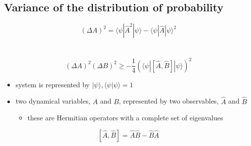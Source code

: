 \documentclass[a4paper,11pt,normalem]{article}
\begin{document}
\subsection{Variance of the distribution of probability}\label{variance-of-the-distribution-of-probability}
\[
    (\Delta A)^2 = \langle\psi|\hat{A}^2|\psi\rangle - \langle\psi|\hat{A}|\psi\rangle^2
\]

\section{}\label{lecture-9}

\[
    (\Delta A)^2(\Delta B)^2 \geq -\frac{1}{4}(\langle\psi|[\hat{A},\hat{B}]|\psi\rangle)^2
\]

\begin{itemize}
\item
  system is represented by \(|\psi\rangle, \langle\psi|\psi\rangle = 1\)
\item
  two dynamical variables, \(A\) and \(B\), represented by two
  observables, \(\hat{A}\) and \(\hat{B}\)
  \begin{itemize}
  \item
    these are Hermitian operators with a complete set of eigenvalues
  \end{itemize}
\end{itemize}
\[
    [\hat{A},\hat{B}] = \hat{A}\hat{B} - \hat{B}\hat{A}
\]
\end{document}
